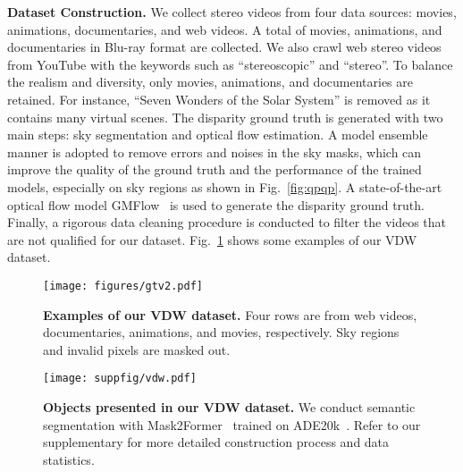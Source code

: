\documentclass[10pt,twocolumn,letterpaper]{article}
\def\data{VDW}
\def\sota{state-of-the-art}
\def\reffig{Fig.}
\begin{document}
\noindent\textbf{Dataset Construction.} We collect stereo videos from four data sources: movies, animations, documentaries, and web videos. A total of  movies, animations, and documentaries in Blu-ray format are collected. We also crawl  web stereo videos from YouTube with the keywords such as ``stereoscopic'' and ``stereo''. To balance the realism and diversity, only  movies, animations, and documentaries are retained. For instance, ``Seven Wonders of the Solar System'' is removed as it contains many virtual scenes. The disparity ground truth is generated with two main steps: sky segmentation and optical flow estimation. A model ensemble manner is adopted to remove errors and noises in the sky masks, which can improve the quality of the ground truth and the performance of the trained models, especially on sky regions as shown in \reffig{}~\ref{fig:qpqp}. A \sota{} optical flow model GMFlow~\cite{gmflow} is used to generate the disparity ground truth. Finally, a rigorous data cleaning procedure is conducted to filter the videos that are not qualified for our dataset. \reffig{}~\ref{fig:datagt} shows some examples of our \data{} dataset. 

\begin{figure}[!t]
\begin{center}
   \texttt{[image: figures/gtv2.pdf]}
\end{center}
\vspace{-12pt}
   \caption{
   \textbf{Examples of our \data{} dataset.}
   Four rows are from web videos, documentaries, animations, and movies, respectively. Sky regions and invalid pixels are masked out.}
\label{fig:datagt}
\end{figure}

\begin{figure}[!t]
\begin{center}
   \texttt{[image: suppfig/vdw.pdf]}
\end{center}
\vspace{-12pt}
   \caption{\textbf{Objects presented in our \data{} dataset.} We conduct semantic segmentation with Mask2Former~\cite{mask2former} trained on ADE20k~\cite{ade20k}. Refer to our supplementary for more detailed construction process and data statistics.}
\label{fig:wccc}
\end{figure}
\end{document}
